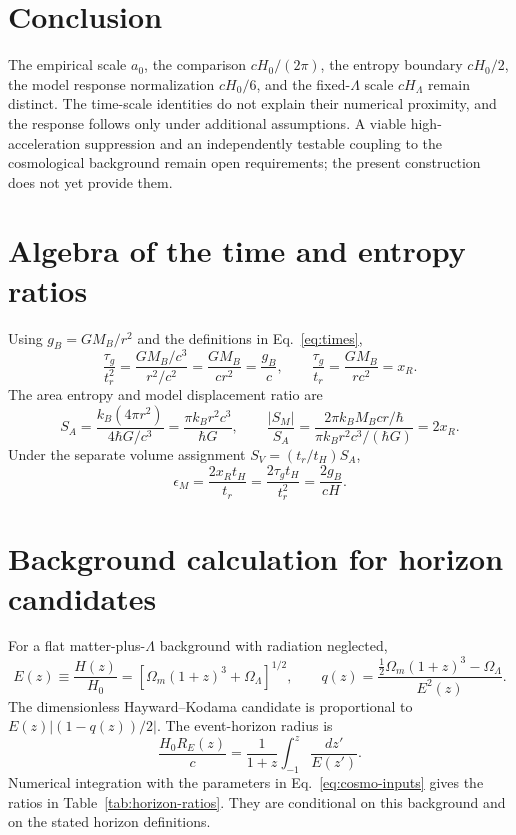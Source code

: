 \documentclass[12pt]{article}
\begin{document}
\section{Conclusion}
\label{sec:conclusion}

The empirical scale $a_0$, the comparison $cH_0/(2\pi)$, the entropy boundary $cH_0/2$, the model response normalization $cH_0/6$, and the fixed-$\Lambda$ scale $cH_\Lambda$ remain distinct. The time-scale identities do not explain their numerical proximity, and the response follows only under additional assumptions. A viable high-acceleration suppression and an independently testable coupling to the cosmological background remain open requirements; the present construction does not yet provide them.

\appendix

\section{Algebra of the time and entropy ratios}
\label{app:algebra}

Using $g_B=GM_B/r^2$ and the definitions in Eq.~\eqref{eq:times},
\begin{equation}
  \frac{\tau_g}{t_r^2}
  =\frac{GM_B/c^3}{r^2/c^2}
  =\frac{GM_B}{c r^2}
  =\frac{g_B}{c},
  \qquad
  \frac{\tau_g}{t_r}
  =\frac{GM_B}{rc^2}=x_R.
  \label{eq:app-time-algebra}
\end{equation}
The area entropy and model displacement ratio are
\begin{equation}
  S_A=\frac{k_B(4\pi r^2)}{4\hbar G/c^3}
     =\frac{\pi k_Br^2c^3}{\hbar G},
  \qquad
  \frac{|S_M|}{S_A}
  =\frac{2\pi k_BM_Bcr/\hbar}{\pi k_Br^2c^3/(\hbar G)}
  =2x_R.
  \label{eq:app-entropy-algebra}
\end{equation}
Under the separate volume assignment $S_V=(t_r/t_H)S_A$,
\begin{equation}
  \epsilon_M
  =\frac{2x_Rt_H}{t_r}
  =\frac{2\tau_gt_H}{t_r^2}
  =\frac{2g_B}{cH}.
  \label{eq:app-epsilon-algebra}
\end{equation}

\section{Background calculation for horizon candidates}
\label{app:horizon-calculation}

For a flat matter-plus-$\Lambda$ background with radiation neglected,
\begin{equation}
  E(z)\equiv\frac{H(z)}{H_0}
  =\left[\Omega_m(1+z)^3+\Omega_\Lambda\right]^{1/2},
  \qquad
  q(z)=\frac{\tfrac12\Omega_m(1+z)^3-\Omega_\Lambda}{E^2(z)}.
  \label{eq:app-hz-q}
\end{equation}
The dimensionless Hayward--Kodama candidate is proportional to $E(z)|(1-q(z))/2|$. The event-horizon radius is
\begin{equation}
  \frac{H_0R_E(z)}{c}
  =\frac{1}{1+z}\int_{-1}^{z}\frac{dz'}{E(z')}.
  \label{eq:app-event-horizon}
\end{equation}
Numerical integration with the parameters in Eq.~\eqref{eq:cosmo-inputs} gives the ratios in Table~\ref{tab:horizon-ratios}. They are conditional on this background and on the stated horizon definitions.
\end{document}
